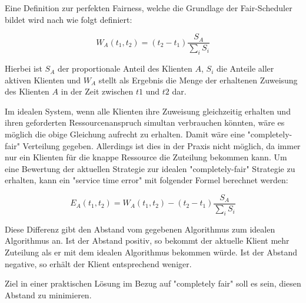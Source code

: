 Eine Definition zur perfekten Fairness, welche die Grundlage der Fair-Scheduler bildet wird nach \cite{usenix} wie folgt definiert:

\begin{equation}
W_A(t_1,t_2) = (t_2 - t_1) \frac{S_A}{\sum_i S_i}
\label{eq:perfect_fairness}
\end{equation}

Hierbei ist $S_A$ der proportionale Anteil des Klienten $A$, $S_i$ die Anteile aller aktiven Klienten und $W_A$ stellt als Ergebnis die Menge der erhaltenen Zuweisung des Klienten $A$ in der Zeit zwischen $t1$ und $t2$ dar.

Im idealen System, wenn alle Klienten ihre Zuweisung gleichzeitig erhalten und ihren geforderten Ressourcenanspruch simultan verbrauchen könnten, wäre es möglich die obige Gleichung aufrecht zu erhalten.
Damit wäre eine "completely-fair" Verteilung gegeben. Allerdings ist dies in der Praxis nicht möglich, da immer nur ein Klienten für die knappe Ressource die Zuteilung bekommen kann.
Um eine Bewertung der aktuellen Strategie zur idealen "completely-fair" Strategie zu erhalten, kann ein "service time error" mit folgender Formel berechnet werden:

\begin{equation}
E_A(t_1,t_2) = W_A(t_1,t_2) - (t_2 - t_1) \frac{S_A}{\sum_i S_i}
\label{eq:perfect_fairness}
\end{equation}

Diese Differenz gibt den Abstand vom gegebenen Algorithmus zum idealen Algorithmus an.
Ist der Abstand positiv, so bekommt der aktuelle Klient mehr Zuteilung als er mit dem idealen Algorithmus bekommen würde. Ist der Abstand negative, so erhält der Klient entsprechend weniger.

Ziel in einer praktischen Lösung im Bezug auf "completely fair" soll es sein, diesen Abstand zu minimieren.
 




